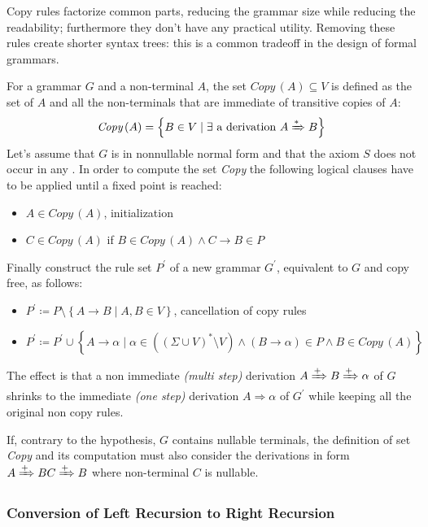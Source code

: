 \documentclass[english]{article}
\begin{document}
Copy rules factorize common parts, reducing the grammar size while reducing the readability;
furthermore they don't have any practical utility.
Removing these rules create shorter syntax trees: this is a common tradeoff in the design of formal grammars.

For a grammar \(G\) and a non-terminal \(A\), the set \(\textit{Copy}\,(A) \subseteq V\) is defined as the set of \(A\) and all the non-terminals that are immediate of transitive copies of \(A\):
\[ \textit{Copy}\,(A) = \left\{ B \in V \mid \exists \text{ a derivation } A \xRightarrow{\ast} B \right\} \]
Let's assume that \(G\) is in nonnullable normal form and that the axiom \(S\) does not occur in any \RP.
In order to compute the set \textit{Copy} the following logical clauses have to be applied until a fixed point is reached:
\begin{itemize}
  \item \(A \in \textit{Copy}\,(A)\), initialization
  \item \(C \in \textit{Copy}\,(A)\) if \(B \in \textit{Copy}\,(A) \land C \rightarrow B \in P\)
\end{itemize}
Finally construct the rule set \(P^\prime\) of a new grammar \(G^\prime\), equivalent to \(G\) and copy free, as follows:
\begin{itemize}
  \item \(P^\prime \coloneqq P \setminus \left\{ A \rightarrow B \mid A, B \in V \right\}\), cancellation of copy rules
  \item \(P^\prime \coloneqq P^\prime \cup \left\{ A \rightarrow \alpha \mid \alpha \in \left( \left( \Sigma \cup V \right)^\ast \setminus V \right) \land \left( B \rightarrow \alpha \right) \in P \land B \in \textit{Copy}\,(A) \right\}\)
\end{itemize}

The effect is that a non immediate \textit{(multi step)} derivation \(A \xRightarrow{+} B \xRightarrow{+} \alpha\) of \(G\) shrinks to the immediate \textit{(one step)} derivation \(A \Rightarrow \alpha\) of \(G^\prime\) while keeping all the original non copy rules.

\bigskip
If, contrary to the hypothesis, \(G\) contains nullable terminals, the definition of set \textit{Copy} and its computation must also consider the derivations in form \(A \xRightarrow{+} BC \xRightarrow{+} B\) where non-terminal \(C\) is nullable.

\subsubsection{Conversion of Left Recursion to Right Recursion}
\label{sec:conversion-of-left-recursion-to-right-recursion}
\end{document}
